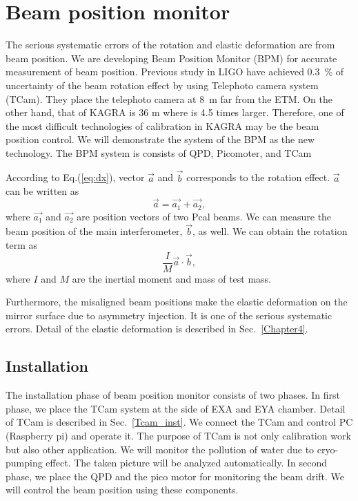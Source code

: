 
\chapter{Beam position monitor} %

\label{Chapter6} %
The serious systematic errors of the rotation and elastic deformation are from beam position.
We are developing Beam Position Monitor (BPM) for accurate measurement of beam position.
Previous study in LIGO have achieved 0.3~\% of uncertainty of the beam rotation effect by using Telephoto camera system (TCam).
They place the telephoto camera at 8~m far from the ETM. On the other hand, that of KAGRA is 36 m where is 4.5 times larger. Therefore, one of the most difficult technologies of calibration in KAGRA may be the beam position control.
We will demonstrate the system of the BPM as  the new technology. The BPM system is consists of QPD, Picomoter, and TCam

According to Eq.(\ref{eq:dx}), vector $\vec{a}$ and $\vec{b}$ corresponds to the rotation effect. $\vec{a}$ can be written as
\begin{equation}
\vec{a}=\vec{a_1} + \vec{a_2},
\end{equation}
where $\vec{a_1}$ and $\vec{a_2}$ are position vectors of two Pcal beams. We can measure the beam position of the main interferometer, $\vec{b}$, as well.
We can obtain the rotation term as
\begin{equation}
\frac{I}{M}\vec{a} \cdot \vec{b},
\end{equation}
where $I$ and $M$ are the inertial moment and mass of test mass.

Furthermore, the misaligned beam positions make the elastic deformation on the mirror surface due to asymmetry injection. It is one of the serious systematic errors.
Detail of the elastic deformation is described in Sec.~\ref{Chapter4}.

\section{Installation}
The installation phase of beam position monitor consists of two phases.
In first phase, we place the TCam system at the side of EXA and EYA chamber.
Detail of TCam is described in Sec.~\ref{Tcam_inst}. We connect the TCam and control PC (Raspberry pi) and operate it.
The purpose of TCam is not only calibration work but also other application.
We will monitor the pollution of water due to cryo-pumping effect. The taken picture will be analyzed automatically.
In second phase, we place the QPD and the pico motor for monitoring the beam drift. We will control the beam position using these components.
